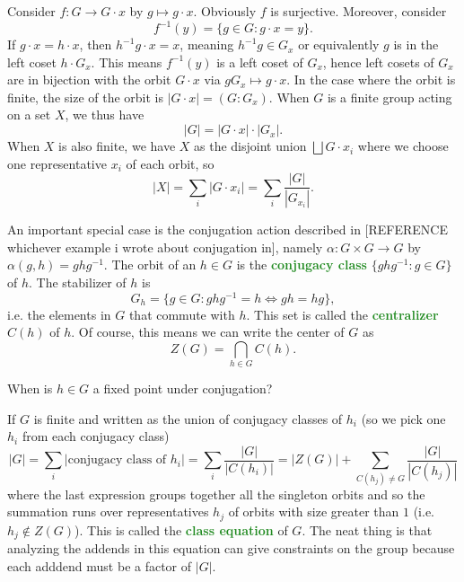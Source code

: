 \documentclass[11pt]{scrartcl}
\providecommand{\inv}{^{-1}}
\providecommand{\vocab}[1]{{\textbf{\textcolor{ForestGreen}{#1}}}}
\providecommand{\abs}[1]{\left|#1\right|}
\begin{document}
Consider $f\colon G\to G\cdot x$ by $g\mapsto g\cdot x$.
Obviously $f$ is surjective. Moreover, consider
\begin{equation*}
    f\inv(y) = \{g\in G : g\cdot x = y\}.
\end{equation*}
If $g\cdot x = h\cdot x$, then $h\inv g\cdot x = x$, meaning
$h\inv g\in G_x$ or equivalently $g$ is in the left coset $h\cdot G_x$.
This means $f\inv(y)$ is a left coset of $G_x$,
hence left cosets of $G_x$ are in bijection with the orbit $G\cdot x$
via $gG_x\mapsto g\cdot x$. In the case where the orbit is finite,
the size of the orbit is $\abs{G\cdot x} = (G : G_x)$.
When $G$ is a finite group acting on a set $X$, we thus have
\begin{equation*}
    \abs G = \abs{G\cdot x}\cdot \abs{G_x}.
\end{equation*}
When $X$ is also finite, we have $X$ as the disjoint union $\bigsqcup G\cdot x_i$
where we choose one representative $x_i$ of each orbit, so
\begin{equation*}
    \abs X = \sum_{i} \abs{G\cdot x_i} = \sum_i \frac{\abs G}{\abs{G_{x_i}}}.
\end{equation*}

An important special case is the conjugation action described in
[REFERENCE whichever example i wrote about conjugation in],
namely $\alpha\colon G\times G\to G$ by $\alpha(g,h) = ghg\inv$.
The orbit of an $h\in G$ is the \vocab{conjugacy class}
$\{ghg\inv : g\in G\}$ of $h$.
The stabilizer of $h$ is
\begin{equation*}
    G_h = \{g\in G : ghg\inv = h \iff gh = hg\},
\end{equation*}
i.e. the elements in $G$ that commute with $h$.
This set is called the \vocab{centralizer} $C(h)$ of $h$.
Of course, this means we can write the center of $G$ as
\begin{equation*}
    Z(G) = \bigcap_{h\in G} C(h).
\end{equation*}

\begin{exercise}
    When is $h\in G$ a fixed point under conjugation?
\end{exercise}

If $G$ is finite and written as the union of conjugacy classes of
$h_i$ (so we pick one $h_i$ from each conjugacy class)
\begin{equation*}
    \abs G = \sum_i \abs{\text{conjugacy class of $h_i$}}
    = \sum_i \frac{\abs G}{\abs{C(h_i)}}
    = \abs{Z(G)} + \sum_{C(h_j)\ne G} \frac{\abs G}{\abs{C(h_j)}}
\end{equation*}
where the last expression groups together all the singleton orbits
and so the summation runs over representatives $h_j$
of orbits with size greater than $1$ (i.e. $h_j\notin Z(G)$).
This is called the \vocab{class equation} of $G$.
The neat thing is that analyzing the addends in this equation
can give constraints on the group
because each adddend must be a factor of $\abs G$.
\end{document}
